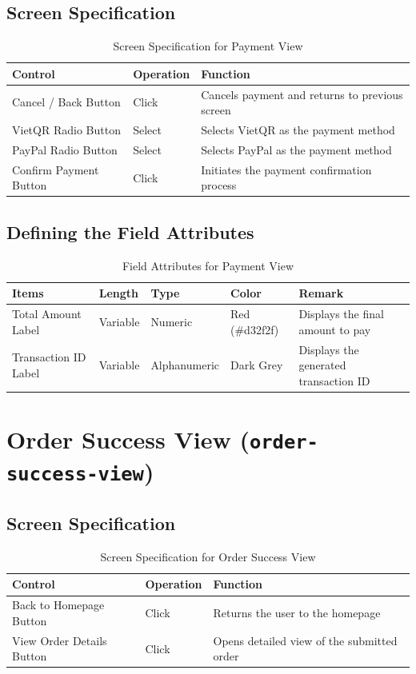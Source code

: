 \documentclass{article}
\begin{document}
\subsection{Screen Specification}
\begin{table}[h!]
\centering
\begin{tabularx}{\textwidth}{|l|l|X|}
\hline
\textbf{Control} & \textbf{Operation} & \textbf{Function} \\
\hline
Cancel / Back Button & Click & Cancels payment and returns to previous screen \\
\hline
VietQR Radio Button & Select & Selects VietQR as the payment method \\
\hline
PayPal Radio Button & Select & Selects PayPal as the payment method \\
\hline
Confirm Payment Button & Click & Initiates the payment confirmation process \\
\hline
\end{tabularx}
\caption{Screen Specification for Payment View}
\end{table}

\subsection{Defining the Field Attributes}
\begin{table}[h!]
\centering
\begin{tabularx}{\textwidth}{|l|l|l|l|X|}
\hline
\textbf{Items} & \textbf{Length} & \textbf{Type} & \textbf{Color} & \textbf{Remark} \\
\hline
Total Amount Label & Variable & Numeric & Red (\#d32f2f) & Displays the final amount to pay \\
\hline
Transaction ID Label & Variable & Alphanumeric & Dark Grey & Displays the generated transaction ID \\
\hline
\end{tabularx}
\caption{Field Attributes for Payment View}
\end{table}

\section{Order Success View (\texttt{order-success-view})}
\subsection{Screen Specification}
\begin{table}[h!]
\centering
\begin{tabularx}{\textwidth}{|l|l|X|}
\hline
\textbf{Control} & \textbf{Operation} & \textbf{Function} \\
\hline
Back to Homepage Button & Click & Returns the user to the homepage \\
\hline
View Order Details Button & Click & Opens detailed view of the submitted order \\
\hline
\end{tabularx}
\caption{Screen Specification for Order Success View}
\end{table}
\end{document}
